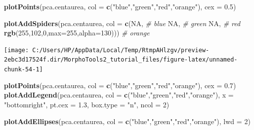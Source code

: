 \documentclass[
]{article}
\newenvironment{Shaded}{\begin{snugshade}}{\end{snugshade}}
\newcommand{\CommentTok}[1]{\textcolor[rgb]{0.56,0.35,0.01}{\textit{#1}}}
\newcommand{\DataTypeTok}[1]{\textcolor[rgb]{0.13,0.29,0.53}{#1}}
\newcommand{\DecValTok}[1]{\textcolor[rgb]{0.00,0.00,0.81}{#1}}
\newcommand{\FloatTok}[1]{\textcolor[rgb]{0.00,0.00,0.81}{#1}}
\newcommand{\KeywordTok}[1]{\textcolor[rgb]{0.13,0.29,0.53}{\textbf{#1}}}
\newcommand{\NormalTok}[1]{#1}
\newcommand{\OtherTok}[1]{\textcolor[rgb]{0.56,0.35,0.01}{#1}}
\newcommand{\StringTok}[1]{\textcolor[rgb]{0.31,0.60,0.02}{#1}}
\begin{document}
\begin{Shaded}
\begin{Highlighting}[]
\KeywordTok{plotPoints}\NormalTok{(pca.centaurea, }\DataTypeTok{col =} \KeywordTok{c}\NormalTok{(}\StringTok{"blue"}\NormalTok{,}\StringTok{"green"}\NormalTok{,}\StringTok{"red"}\NormalTok{,}\StringTok{"orange"}\NormalTok{), }\DataTypeTok{cex =} \FloatTok{0.5}\NormalTok{)}

\KeywordTok{plotAddSpiders}\NormalTok{(pca.centaurea, }\DataTypeTok{col =} \KeywordTok{c}\NormalTok{(}\OtherTok{NA}\NormalTok{, }\CommentTok{# blue}
                                      \OtherTok{NA}\NormalTok{, }\CommentTok{# green}
                                      \OtherTok{NA}\NormalTok{, }\CommentTok{# red}
                                      \KeywordTok{rgb}\NormalTok{(}\DecValTok{255}\NormalTok{,}\DecValTok{102}\NormalTok{,}\DecValTok{0}\NormalTok{,}\DataTypeTok{max=}\DecValTok{255}\NormalTok{,}\DataTypeTok{alpha=}\DecValTok{130}\NormalTok{))) }\CommentTok{# orange}
\end{Highlighting}
\end{Shaded}

\begin{center}\texttt{[image: C:/Users/HP/AppData/Local/Temp/RtmpAHlzgv/preview-2ebc3d17524f.dir/MorphoTools2\_tutorial\_files/figure-latex/unnamed-chunk-54-1]} \end{center}

\begin{Shaded}
\begin{Highlighting}[]
\KeywordTok{plotPoints}\NormalTok{(pca.centaurea, }\DataTypeTok{col =} \KeywordTok{c}\NormalTok{(}\StringTok{"blue"}\NormalTok{,}\StringTok{"green"}\NormalTok{,}\StringTok{"red"}\NormalTok{,}\StringTok{"orange"}\NormalTok{), }\DataTypeTok{cex =} \FloatTok{0.7}\NormalTok{)}
\KeywordTok{plotAddLegend}\NormalTok{(pca.centaurea, }\DataTypeTok{col =} \KeywordTok{c}\NormalTok{(}\StringTok{"blue"}\NormalTok{,}\StringTok{"green"}\NormalTok{,}\StringTok{"red"}\NormalTok{,}\StringTok{"orange"}\NormalTok{), }
               \DataTypeTok{x =} \StringTok{"bottomright"}\NormalTok{, }\DataTypeTok{pt.cex =} \FloatTok{1.3}\NormalTok{, }\DataTypeTok{box.type =} \StringTok{"n"}\NormalTok{, }\DataTypeTok{ncol =} \DecValTok{2}\NormalTok{)}

\KeywordTok{plotAddEllipses}\NormalTok{(pca.centaurea, }\DataTypeTok{col =} \KeywordTok{c}\NormalTok{(}\StringTok{"blue"}\NormalTok{,}\StringTok{"green"}\NormalTok{,}\StringTok{"red"}\NormalTok{,}\StringTok{"orange"}\NormalTok{), }\DataTypeTok{lwd =} \DecValTok{2}\NormalTok{)}
\end{Highlighting}
\end{Shaded}
\end{document}
